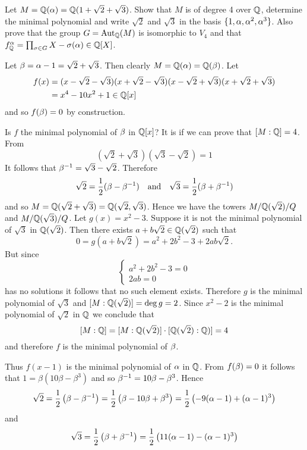     \begin{ex}{21.26}
        Let $M=\mathbb{Q}(\alpha)=\mathbb{Q}(1+\sqrt{2}+\sqrt{3})$. Show that $M$ is of degree 4 over $\mathbb{Q}$, determine the minimal polynomial and write $\sqrt{2}$ and $\sqrt{3}$ in the basis $\{1,\alpha, \alpha^2,\alpha^3\}$.
        Also prove that the group $G=\text{Aut}_{\mathbb{Q}}(M)$ is isomorphic to $V_4$ and that $f^\alpha_{\mathbb{Q}}=\prod_{\sigma\in G}X-\sigma(\alpha)\in\mathbb{Q}[X]$.
    \end{ex}
    \begin{sol}
        Let $\beta = \alpha-1=\sqrt{2}+\sqrt{3}$. Then clearly $M=\mathbb{Q}(\alpha)=\mathbb{Q}(\beta)$. Let
        \begin{align*}
            f(x)&=(x-\sqrt{2}-\sqrt{3})(x+\sqrt{2}-\sqrt{3})(x-\sqrt{2}+\sqrt{3})(x+\sqrt{2}+\sqrt{3})\\
            &=x^4-10x^2+1\in\mathbb{Q}[x]
        \end{align*}
        and so $f(\beta)=0$ by construction. 
        
        Is $f$ the minimal polynomial of $\beta$ in $\mathbb{Q}[x]$? It is if we can prove that $[M:\mathbb{Q}]=4$.
        From
        $$ (\sqrt{2}+\sqrt{3})(\sqrt{3}-\sqrt{2})=1 $$
        It follows that $\beta^{-1}=\sqrt{3}-\sqrt{2}$. Therefore
        $$ \sqrt{2}=\frac12(\beta-\beta^{-1})\quad\text{and}\quad\sqrt{3}=\frac12(\beta+\beta^{-1})$$
        and so $M=\mathbb{Q}(\sqrt{2}+\sqrt{3})=\mathbb{Q}(\sqrt{2},\sqrt{3})$. 
        Hence we have the towers $M/\mathbb{Q}(\sqrt{2})/Q$ and $M/\mathbb{Q}(\sqrt{3})/Q$. 
        Let $g(x)=x^2-3$. Suppose it is not the minimal polynomial of $\sqrt{3}$ in $\mathbb{Q}(\sqrt{2})$.
        Then there exists $a+b\sqrt{2}\in\mathbb{Q}(\sqrt{2})$ such that
        $$ 0 = g(a+b\sqrt{2})=a^2+2b^2-3+2ab\sqrt{2}.$$
        But since
        \begin{equation*}
            \begin{cases}
                a^2+2b^2-3=0\\
                2ab=0
            \end{cases}
        \end{equation*}
        has no solutions it follows that no such element exists.
        Therefore $g$ is the minimal polynomial of $\sqrt{3}$ and $[M:\mathbb{Q}(\sqrt{2})]=\deg g=2$.
        Since $x^2-2$ is the minimal polynomial of $\sqrt{2}$ in $\mathbb{Q}$ we conclude that 
        $$[M:\mathbb{Q}]=[M:\mathbb{Q}(\sqrt{2})]\cdot[\mathbb{Q}(\sqrt{2}):\mathbb{Q})]=4$$ 
        and therefore $f$ is the minimal polynomial of $\beta$.

        Thus $f(x-1)$ is the minimal polynomial of $\alpha$ in $\mathbb{Q}$. 
        From $f(\beta)=0$ it follows that $1=\beta(10\beta-\beta^3)$ and so $\beta^{-1}=10\beta-\beta^3$.
        Hence
        $$\sqrt{2}=\frac12\left(\beta-\beta^{-1}\right)=\frac12\left(\beta-10\beta+\beta^3\right)=\frac12\left(-9(\alpha-1)+(\alpha-1)^3\right)$$
        and
        $$\sqrt{3}=\frac12\left(\beta+\beta^{-1}\right)=\frac12\left(11(\alpha-1)-(\alpha-1)^3\right)$$


\end{sol}
